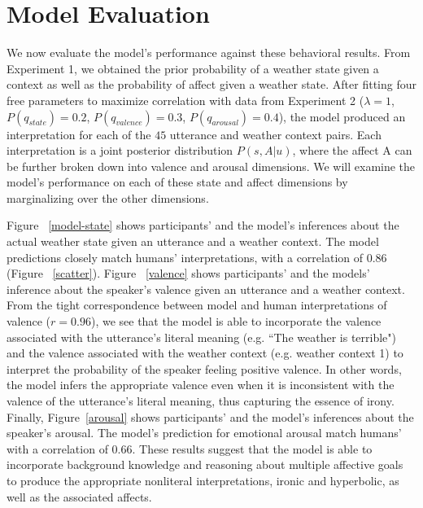 \documentclass[10pt,letterpaper]{article}
\begin{document}
\section{Model Evaluation}
We now evaluate the model's performance against these behavioral results. From Experiment 1, we obtained the prior probability of a weather state given a context as well as the probability of affect given a weather state. After fitting four free parameters to maximize correlation with data from Experiment 2 ($\lambda=1$, $P(q_{state}) = 0.2$, $P(q_{valence}) = 0.3$, $P(q_{arousal}) = 0.4$), 
the model produced an interpretation for each of the $45$ utterance and weather context pairs. Each interpretation is a joint posterior distribution $P(s, A | u)$, where the affect A can be further broken down into valence and arousal dimensions. We will examine the model's performance on each of these state and affect dimensions by marginalizing over the other dimensions.

Figure ~\ref{model-state} shows participants' and the model's inferences about the actual weather state given an utterance and a weather context. The model predictions closely match humans' interpretations, with a correlation of $0.86$ (Figure ~\ref{scatter}). 
Figure ~\ref{valence} shows participants' and the models' inference about the speaker's valence given an utterance and a weather context. From the tight correspondence between model and human interpretations of valence ($r=0.96$), we see that the model is able to incorporate the valence associated with the utterance's literal meaning (e.g. ``The weather is terrible") and the valence associated with the weather context (e.g. weather context 1) to interpret the probability of the speaker feeling positive valence. In other words, the model infers the appropriate valence even when it is inconsistent with the valence of the utterance's literal meaning, thus capturing the essence of irony.  
Finally, Figure~\ref{arousal} shows participants' and the model's inferences about the speaker's arousal.  The model's prediction for emotional arousal match humans' with a correlation of $0.66$.
These results suggest that the model is able to incorporate background knowledge and reasoning about multiple affective goals to produce the appropriate nonliteral interpretations, ironic and hyperbolic, as well as the associated affects. 
\end{document}
